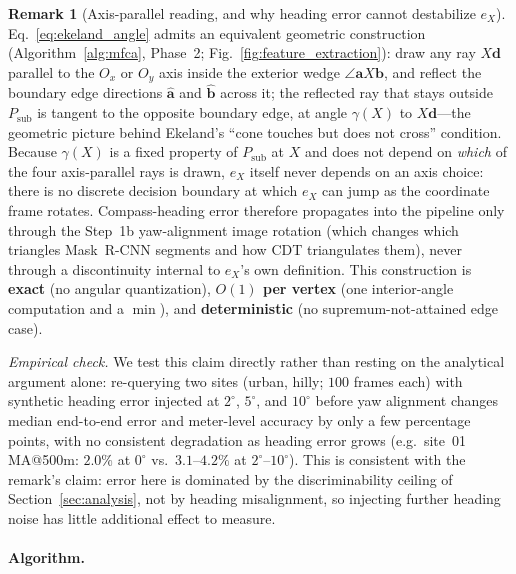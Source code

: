 \documentclass[10pt]{article}
\theoremstyle{plain}
\theoremstyle{definition}
\newtheorem{remark}[theorem]{Remark}
\begin{document}
\begin{remark}[Axis-parallel reading, and why heading error cannot destabilize $e_X$]
\label{rem:axis_reading}
Eq.~\eqref{eq:ekeland_angle} admits an equivalent geometric construction
(Algorithm~\ref{alg:mfca}, Phase~2; Fig.~\ref{fig:feature_extraction}): draw
any ray $X\mathbf{d}$ parallel to the $O_x$ or $O_y$ axis inside the exterior
wedge $\angle\mathbf{a}X\mathbf{b}$, and reflect the boundary edge directions
$\hat{\mathbf{a}}$ and $\hat{\mathbf{b}}$ across it; the reflected ray that
stays outside $P_{\mathrm{sub}}$ is tangent to the opposite boundary edge, at
angle $\gamma(X)$ to $X\mathbf{d}$---the geometric picture behind Ekeland's
``cone touches but does not cross'' condition.
Because $\gamma(X)$ is a fixed property of $P_{\mathrm{sub}}$ at $X$ and does
not depend on \emph{which} of the four axis-parallel rays is drawn, $e_X$
itself never depends on an axis choice: there is no discrete decision
boundary at which $e_X$ can jump as the coordinate frame rotates.
Compass-heading error therefore propagates
into the pipeline only through the Step~1b yaw-alignment image rotation
(which changes which triangles Mask~R-CNN segments and how CDT triangulates
them), never through a discontinuity internal to $e_X$'s own definition.
This construction is \textbf{exact} (no angular quantization),
\textbf{$O(1)$ per vertex} (one interior-angle computation and a $\min$),
and \textbf{deterministic} (no supremum-not-attained edge case).
\end{remark}

\noindent\textit{Empirical check.} We test this claim directly rather than
resting on the analytical argument alone: re-querying two sites (urban,
hilly; $100$ frames each) with synthetic heading error injected at $2^\circ$,
$5^\circ$, and $10^\circ$ before yaw alignment changes median end-to-end
error and meter-level accuracy by only a few percentage points, with no
consistent degradation as heading error grows (e.g.\ site~01 MA@500m:
$2.0\%$ at $0^\circ$ vs.\ $3.1$--$4.2\%$ at $2^\circ$--$10^\circ$). This is
consistent with the remark's claim: error here is dominated by the
discriminability ceiling of Section~\ref{sec:analysis}, not by heading
misalignment, so injecting further heading noise has little additional
effect to measure.


\paragraph{Algorithm.}
\end{document}
